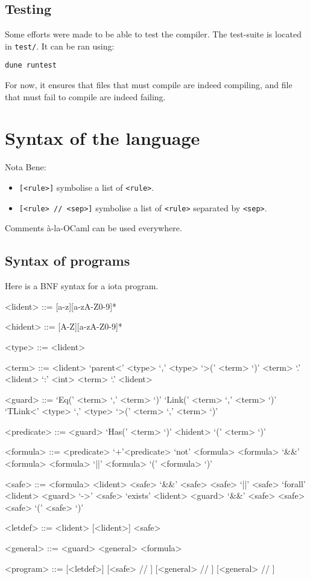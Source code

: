 \documentclass[10pt,a4paper]{article}
\begin{document}
\subsection{Testing}
Some efforts were made to be able to test the compiler. The test-suite is located in \verb|test/|. It can be ran using:
\begin{verbatim}
dune runtest
\end{verbatim}
For now, it ensures that files that must compile are indeed compiling, and file that must fail to compile are indeed failing.

\section{Syntax of the language}
Nota Bene:
\begin{itemize}
\item \verb|[<rule>]| symbolise a list of \verb|<rule>|.
\item \verb|[<rule> // <sep>]| symbolise a list of \verb|<rule>| separated by \verb|<sep>|.
\end{itemize}

Comments à-la-OCaml can be used everywhere.

\subsection{Syntax of programs}
\label{subsec:syntaxprog} Here is a BNF syntax for a iota program.
\begin{grammar}
  <lident> ::= [a-z][a-zA-Z0-9]*

  <hident> ::= [A-Z][a-zA-Z0-9]*

  <type> ::= <lident>

  <term> ::= <lident>
  \alt `parent<' <type> `,' <type> `>(' <term> `)'
  \alt <term> `.' <lident> `:' <int>
  \alt <term> `.' <lident>

  <guard> ::= `Eq(' <term> `,' <term> `)'
  \alt `Link(' <term> `,' <term> `)'
  \alt `TLink<' <type> `,' <type> `>(' <term> `,' <term> `)'

  <predicate> ::= <guard>
  \alt `Has(' <term> `)'
  \alt <hident> `(' <term> `)'

  <formula> ::= <predicate>
  \alt `+'<predicate>
  \alt `not' <formula>
  \alt <formula> `&&' <formula>
  \alt <formula> `||' <formula>
  \alt `(' <formula> `)'

  <safe> ::= <formula>
  \alt <lident>
  \alt <safe> `&&' <safe>
  \alt <safe> `||' <safe>
  \alt `forall' <lident> <guard> `->' <safe>
  \alt `exists' <lident> <guard> `&&' <safe>
  \alt <safe> <safe>
  \alt `(' <safe> `)'

  <letdef> ::=  <lident> [<lident>] \lit{=} <safe>

  <general> ::=
  <guard> \lit{->} <general>
  \alt \lit{=>} <formula>

  <program> ::=
  [<letdef>]  [<safe> // \lit{;}]  [<general> // \lit{;}]  [<general> // \lit{;}]

\end{grammar}
\end{document}
